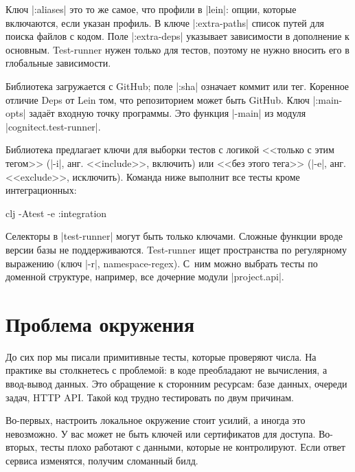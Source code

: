 
Ключ \spverb|:aliases| это то же самое, что профили в \spverb|lein|: опции,
которые включаются, если указан профиль. В ключе \spverb|:extra-paths| список
путей для поиска файлов с кодом. Поле \spverb|:extra-deps| указывает зависимости
в дополнение к основным. Test-runner нужен только для тестов, поэтому не нужно
вносить его в глобальные зависимости.

Библиотека загружается с GitHub; поле \spverb|:sha| означает коммит или
тег. Коренное отличие Deps от Lein том, что репозиторием может быть GitHub. Ключ
\spverb|:main-opts| зада\"{е}т входную точку программы. Это функция \spverb|-main|
из модуля \spverb|cognitect.test-runner|.

Библиотека предлагает ключи для выборки тестов с логикой <<только с этим тегом>>
(\spverb|-i|, анг. <<include>>, включить) или <<без этого тега>> (\spverb|-e|,
анг. <<exclude>>, исключить). Команда ниже выполнит все тесты кроме
интеграционных:

\begin{english}
  \begin{bash}
clj -Atest -e :integration
  \end{bash}
\end{english}

Селекторы в \spverb|test-runner| могут быть только ключами. Сложные функции
вроде версии базы не поддерживаются. Test-runner ищет пространства по
регулярному выражению (ключ \spverb|-r|, namespace-regex). С~ним можно выбрать
тесты по доменной структуре, например, все дочерние модули \spverb|project.api|.

\section{Проблема окружения}


До сих пор мы писали примитивные тесты, которые проверяют числа. На практике вы
столкнетесь с проблемой: в коде преобладают не вычисления, а ввод-вывод
данных. Это обращение к сторонним ресурсам: базе данных, очереди задач, HTTP
API. Такой код трудно тестировать по двум причинам.

Во-первых, настроить локальное окружение стоит усилий, а иногда это
невозможно. У вас может не быть ключей или сертификатов для доступа. Во-вторых,
тесты плохо работают с данными, которые не контролируют. Если ответ сервиса
изменятся, получим сломанный билд.

